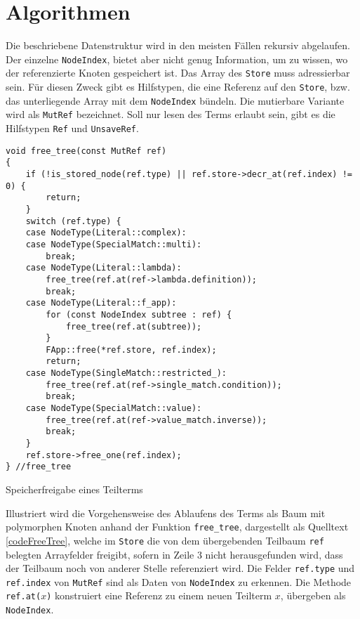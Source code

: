 \section{Algorithmen} \label{subsecCppAlgos}

Die beschriebene Datenstruktur wird in den meisten Fällen rekursiv abgelaufen. Der einzelne \verb|NodeIndex|, bietet aber nicht genug Information, um zu wissen, wo der referenzierte Knoten gespeichert ist. Das Array des \verb|Store| muss adressierbar sein. Für diesen Zweck gibt es Hilfstypen, die eine Referenz auf den \verb|Store|, bzw. das unterliegende Array mit dem \verb|NodeIndex| bündeln. Die mutierbare Variante wird als \verb|MutRef| bezeichnet. Soll nur lesen des Terms erlaubt sein, gibt es die Hilfstypen \verb|Ref| und \verb|UnsaveRef|. 

\begin{listing}
\footnotesize
\begin{verbatim}
void free_tree(const MutRef ref)
{
    if (!is_stored_node(ref.type) || ref.store->decr_at(ref.index) != 0) { 
        return; 
    }
    switch (ref.type) {
    case NodeType(Literal::complex):
    case NodeType(SpecialMatch::multi):
        break;
    case NodeType(Literal::lambda):
        free_tree(ref.at(ref->lambda.definition));
        break;
    case NodeType(Literal::f_app):
        for (const NodeIndex subtree : ref) {
            free_tree(ref.at(subtree));
        }
        FApp::free(*ref.store, ref.index);
        return;
    case NodeType(SingleMatch::restricted_):
        free_tree(ref.at(ref->single_match.condition));
        break;
    case NodeType(SpecialMatch::value):
        free_tree(ref.at(ref->value_match.inverse));
        break;
    }
    ref.store->free_one(ref.index);
} //free_tree
\end{verbatim}
\label{codeFreeTree}
\caption{Speicherfreigabe eines Teilterms}
\end{listing}

Illustriert wird die Vorgehensweise des Ablaufens des Terms als Baum mit polymorphen Knoten anhand der Funktion \verb|free_tree|, dargestellt als Quelltext \ref{codeFreeTree}, welche im \verb|Store| die von dem übergebenden Teilbaum \verb|ref| belegten Arrayfelder freigibt, sofern in Zeile 3 nicht herausgefunden wird, dass der Teilbaum noch von anderer Stelle referenziert wird. Die Felder \verb|ref.type| und \verb|ref.index| von \verb|MutRef| sind als Daten von \verb|NodeIndex| zu erkennen. Die Methode \verb|ref.at(|$x$\verb|)| konstruiert eine Referenz zu einem neuen Teilterm $x$, übergeben als \verb|NodeIndex|.

